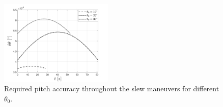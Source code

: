 \begin{figure}[htbp]
  \centering
      \includegraphics[width=0.48\textwidth]{figs/dtheta.png}
  \caption{Required pitch accuracy throughout the slew maneuvers for different $\theta_0$.}
	\label{fig:dtheta}
\end{figure}
